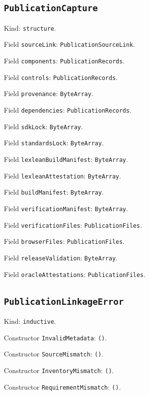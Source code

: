 \documentclass[11pt]{article}
\begin{document}
\subsection*{\texttt{PublicationCapture}}
\noindent Kind: \texttt{structure}.\par
\noindent Field \texttt{sourceLink}: \texttt{PublicationSourceLink}.\par
\noindent Field \texttt{components}: \texttt{PublicationRecords}.\par
\noindent Field \texttt{controls}: \texttt{PublicationRecords}.\par
\noindent Field \texttt{provenance}: \texttt{ByteArray}.\par
\noindent Field \texttt{dependencies}: \texttt{PublicationRecords}.\par
\noindent Field \texttt{sdkLock}: \texttt{ByteArray}.\par
\noindent Field \texttt{standardsLock}: \texttt{ByteArray}.\par
\noindent Field \texttt{lexleanBuildManifest}: \texttt{ByteArray}.\par
\noindent Field \texttt{lexleanAttestation}: \texttt{ByteArray}.\par
\noindent Field \texttt{buildManifest}: \texttt{ByteArray}.\par
\noindent Field \texttt{verificationManifest}: \texttt{ByteArray}.\par
\noindent Field \texttt{verificationFiles}: \texttt{PublicationFiles}.\par
\noindent Field \texttt{browserFiles}: \texttt{PublicationFiles}.\par
\noindent Field \texttt{releaseValidation}: \texttt{ByteArray}.\par
\noindent Field \texttt{oracleAttestations}: \texttt{PublicationFiles}.\par
\subsection*{\texttt{PublicationLinkageError}}
\noindent Kind: \texttt{inductive}.\par
\noindent Constructor \texttt{InvalidMetadata}: \texttt{()}.\par
\noindent Constructor \texttt{SourceMismatch}: \texttt{()}.\par
\noindent Constructor \texttt{InventoryMismatch}: \texttt{()}.\par
\noindent Constructor \texttt{RequirementMismatch}: \texttt{()}.\par
\end{document}
